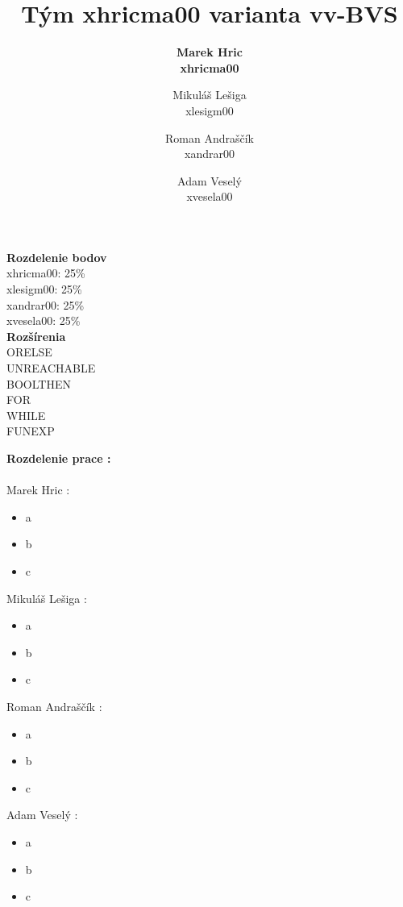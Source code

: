 \documentclass[12pt]{article}
\begin{document}
 
 
\title{\Huge \textbf{Tým xhricma00 varianta vv-BVS}}

\author{\bf Marek Hric \\
\bf xhricma00
\and Mikuláš Lešiga\\
 xlesigm00
\and Roman Andraščík \\
 xandrar00
\and Adam Veselý \\ 
xvesela00
}

\maketitle
\bigskip
\begin{center}
 \Large \textbf{Rozdelenie bodov}  \normalsize
 \\ 
\medskip
xhricma00: 25\% \\
xlesigm00: 25\% \\
xandrar00: 25\% \\
xvesela00: 25\%  \\
\bigskip
 \Large \textbf{Rozšírenia} \normalsize
\\
\medskip
ORELSE\\
UNREACHABLE\\
BOOLTHEN\\
FOR\\
WHILE\\
FUNEXP\\
\end{center}

\newpage

\noindent \Large \textbf{Rozdelenie prace :} \\
\noindent\makebox[\linewidth]{\rule{\textwidth}{0.4pt}}
\newline \\
\large Marek Hric : 
\normalsize
\begin{itemize}
\item a
\item b
\item c
\end{itemize}
\large Mikuláš Lešiga :
\normalsize
\begin{itemize}
\item a
\item b
\item c
\end{itemize}
\large Roman Andraščík :
\normalsize
\begin{itemize}
\item a
\item b
\item c
\end{itemize}
\large Adam Veselý :
\normalsize
\begin{itemize}
\item a
\item b
\item c
\end{itemize}
 
\end{document}
